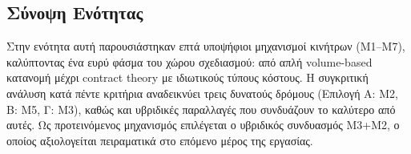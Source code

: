 \subsection{Σύνοψη Ενότητας}
\label{subsec:inc_summary}

Στην ενότητα αυτή παρουσιάστηκαν επτά υποψήφιοι μηχανισμοί κινήτρων (M1--M7), καλύπτοντας ένα
ευρύ φάσμα του χώρου σχεδιασμού: από απλή volume-based κατανομή μέχρι contract theory με ιδιωτικούς
τύπους κόστους. Η συγκριτική ανάλυση κατά πέντε κριτήρια αναδεικνύει τρεις δυνατούς δρόμους
(Επιλογή Α: M2, Β: M5, Γ: M3), καθώς και υβριδικές παραλλαγές που συνδυάζουν το καλύτερο
από αυτές. Ως προτεινόμενος μηχανισμός επιλέγεται ο υβριδικός συνδυασμός M3+M2, ο οποίος
αξιολογείται πειραματικά στο επόμενο μέρος της εργασίας.
